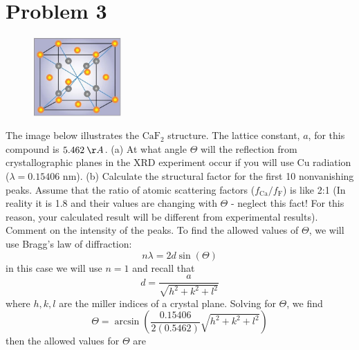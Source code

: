 \documentclass{article}
\begin{document}
\section*{Problem 3}
\begin{figure}
    \begin{center}
        \includegraphics[width = 0.30\textwidth]{lattice.jpg}
    \end{center}
\end{figure}
The image below illustrates the $\text{CaF}_2$ structure. The lattice constant, $a$, for this compound is $5.462 \: \AA$. 
(a) At what angle $\Theta$ will the reflection from crystallographic planes in the XRD experiment occur if you will use Cu radiation ($\lambda = 0.15406 \text{ nm}$). 
(b) Calculate the structural factor for the first 10 nonvanishing peaks. 
Assume that the ratio of atomic scattering factors ($f_{\text{Ca}}/f_{\text{F}}$) is like 2:1 (In reality it is 1.8 and their values are changing with $\Theta$ - neglect this fact! 
For this reason, your calculated result will be different from experimental results).
Comment on the intensity of the peaks.
\newline\newline
To find the allowed values of $\Theta$, we will use Bragg's law of diffraction:
\[n\lambda = 2d\sin(\Theta)\]
in this case we will use $n = 1$ and recall that
\[d = \frac{a}{\sqrt{h^2 + k^2 + l^2}}\]
where $h,k,l$ are the miller indices of a crystal plane.
Solving for $\Theta$, we find
\[\Theta = \arcsin\left(\frac{0.15406}{2(0.5462)}\sqrt{h^2 + k^2 + l^2}\right)\]
then the allowed values for $\Theta$ are 
\end{document}
